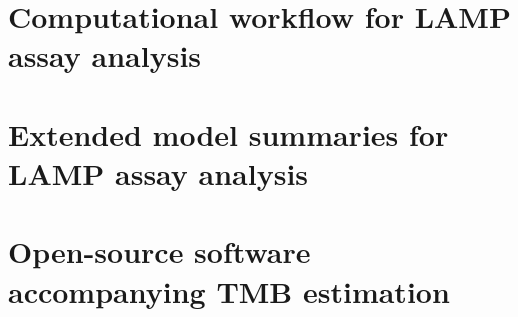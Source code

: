 \documentclass[12pt,twoside,openright]{report}
\theoremstyle{definition}
\begin{document}



\appendix

\chapter{Computational workflow for LAMP assay analysis}
\label{appchap:lamp_code}


\chapter{Extended model summaries for LAMP assay analysis}
\label{appchap:lamp_models}


\chapter{Open-source software accompanying TMB estimation} \label{appchap:tmb}

\end{document}
